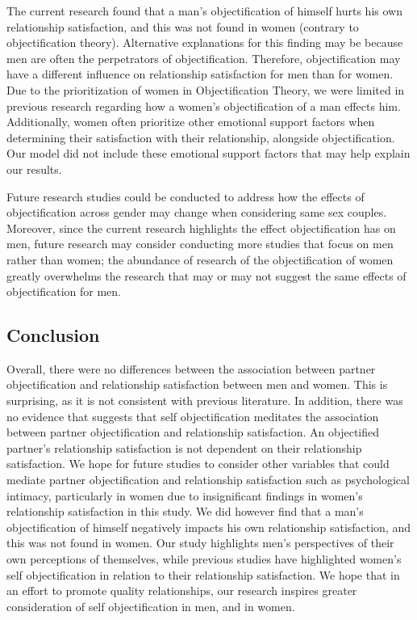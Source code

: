 \documentclass[
  man]{apa6}
\begin{document}
The current research found that a man's objectification of himself hurts his own relationship satisfaction, and this was not found in women (contrary to objectification theory). Alternative explanations for this finding may be because men are often the perpetrators of objectification. Therefore, objectification may have a different influence on relationship satisfaction for men than for women. Due to the prioritization of women in Objectification Theory, we were limited in previous research regarding how a women's objectification of a man effects him. Additionally, women often prioritize other emotional support factors when determining their satisfaction with their relationship, alongside objectification. Our model did not include these emotional support factors that may help explain our results.

Future research studies could be conducted to address how the effects of objectification across gender may change when considering same sex couples. Moreover, since the current research highlights the effect objectification has on men, future research may consider conducting more studies that focus on men rather than women; the abundance of research of the objectification of women greatly overwhelms the research that may or may not suggest the same effects of objectification for men.

\hypertarget{conclusion}{%
\subsection{Conclusion}\label{conclusion}}

Overall, there were no differences between the association between partner objectification and relationship satisfaction between men and women. This is surprising, as it is not consistent with previous literature. In addition, there was no evidence that suggests that self objectification meditates the association between partner objectification and relationship satisfaction. An objectified partner's relationship satisfaction is not dependent on their relationship satisfaction. We hope for future studies to consider other variables that could mediate partner objectification and relationship satisfaction such as psychological intimacy, particularly in women due to insignificant findings in women's relationship satisfaction in this study. We did however find that a man's objectification of himself negatively impacts his own relationship satisfaction, and this was not found in women. Our study highlights men's perspectives of their own perceptions of themselves, while previous studies have highlighted women's self objectification in relation to their relationship satisfaction. We hope that in an effort to promote quality relationships, our research inspires greater consideration of self objectification in men, and in women.
\end{document}
